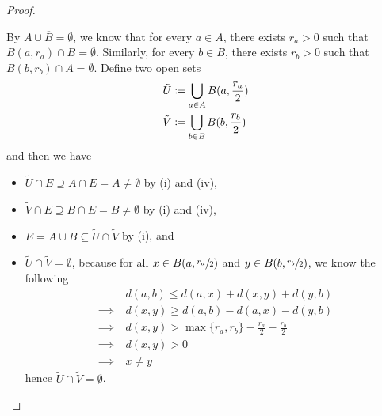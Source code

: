 \documentclass[screen,single]{techreport}
\numberwithin{equation}{section}
\begin{document}
\begin{proof}
\begin{itemize}
		By $A \cup \overline{B} = \emptyset$, we know that for every $a \in A$, there exists $r_a > 0$ such that $B(a,r_a) \cap B = \emptyset$.
		Similarly, for every $b \in B$, there exists $r_b > 0$ such that $B(b,r_b) \cap A = \emptyset$.
		Define two open sets
		\begin{align*}
			\tilde{U} & \coloneqq \bigcup_{a \in A} B({a,\frac{r_a}{2}}) \\
			\tilde{V} & \coloneqq \bigcup_{b \in B} B({b,\frac{r_b}{2}})
		\end{align*}
		and then we have
		\begin{itemize}
			\item $\tilde{U} \cap E \supseteq A \cap E  = A \neq \emptyset$ by (i) and (iv),
			\item $\tilde{V} \cap E \supseteq B \cap E = B \neq \emptyset$ by (i) and (iv),
			\item $E = A \cup B \subseteq \tilde{U} \cap \tilde{V}$ by (i), and
			\item $\tilde{U} \cap \tilde{V} = \emptyset$, because for all $x \in B(a,\sfrac{r_a}{2})$ and $y \in B(b,\sfrac{r_b}{2})$, we know the following
			\begin{align*}
				& d(a,b) \le d(a,x) + d(x,y) + d(y,b) \\
				\implies~ & d(x,y) \ge d(a,b) - d(a,x) - d(y,b) \\
				\implies~ & d(x,y) > \max\{r_a,r_b\} - \frac{r_a}{2} - \frac{r_b}{2} \\
				\implies~ & d(x,y) > 0 \\
				\implies~ & x \neq y
			\end{align*}
			hence $\tilde{U} \cap \tilde{V} = \emptyset$.
		\end{itemize}
	\end{itemize}
\end{proof}
\end{document}
